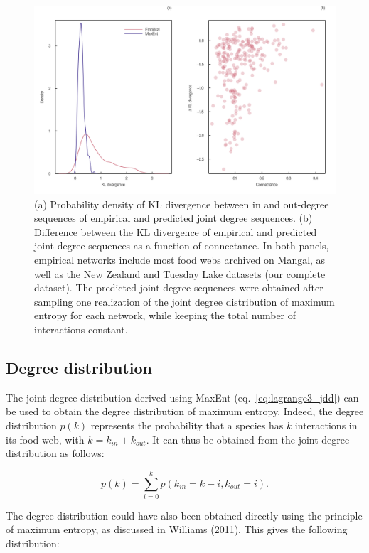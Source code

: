 \documentclass[11pt]{article}
\makeatletter
\def\maxwidth{\ifdim\Gin@nat@width>\linewidth\linewidth
\else\Gin@nat@width\fi}
\let\Oldincludegraphics\includegraphics
\renewcommand{\includegraphics}[1]{\Oldincludegraphics[width=\maxwidth]{#1}}
\makeatother
\begin{document}
\begin{figure}
\hypertarget{fig:kl_diverg}{%
\centering
\includegraphics{figures/kl_divergence.png}
\caption{(a) Probability density of KL divergence between in and
out-degree sequences of empirical and predicted joint degree sequences.
(b) Difference between the KL divergence of empirical and predicted
joint degree sequences as a function of connectance. In both panels,
empirical networks include most food webs archived on Mangal, as well as
the New Zealand and Tuesday Lake datasets (our complete dataset). The
predicted joint degree sequences were obtained after sampling one
realization of the joint degree distribution of maximum entropy for each
network, while keeping the total number of interactions
constant.}\label{fig:kl_diverg}
}
\end{figure}

\hypertarget{degree-distribution}{%
\subsection{Degree distribution}\label{degree-distribution}}

The joint degree distribution derived using MaxEnt
(eq.~\ref{eq:lagrange3_jdd}) can be used to obtain the degree
distribution of maximum entropy. Indeed, the degree distribution
\(p(k)\) represents the probability that a species has \(k\)
interactions in its food web, with \(k = k_{in} + k_{out}\). It can thus
be obtained from the joint degree distribution as follows:

\[p(k) = \sum_{i=0}^k p(k_{in} = k - i, k_{out} = i).\]

The degree distribution could have also been obtained directly using the
principle of maximum entropy, as discussed in Williams (2011). This
gives the following distribution:
\end{document}
